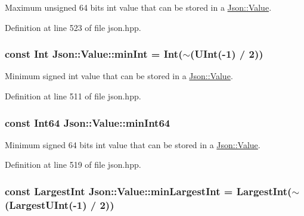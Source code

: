Maximum unsigned 64 bits int value that can be stored in a \hyperlink{class_json_1_1_value}{Json\-::\-Value}. 



Definition at line 523 of file json.\-hpp.

\hypertarget{class_json_1_1_value_a7df8a39e2502b8c92a6a41e3d752d2c8}{
\subsubsection[{min\-Int}]{\setlength{\rightskip}{0pt plus 5cm}const {\bf Int} Json\-::\-Value\-::min\-Int = {\bf Int}($\sim$({\bf U\-Int}(-\/1) / 2))\hspace{0.3cm}{\ttfamily [static]}}}\label{class_json_1_1_value_a7df8a39e2502b8c92a6a41e3d752d2c8}


Minimum signed int value that can be stored in a \hyperlink{class_json_1_1_value}{Json\-::\-Value}. 



Definition at line 511 of file json.\-hpp.

\hypertarget{class_json_1_1_value_a815ef899bc312c93bc426511acfe31a7}{
\subsubsection[{min\-Int64}]{\setlength{\rightskip}{0pt plus 5cm}const {\bf Int64} Json\-::\-Value\-::min\-Int64\hspace{0.3cm}{\ttfamily [static]}}}\label{class_json_1_1_value_a815ef899bc312c93bc426511acfe31a7}


Minimum signed 64 bits int value that can be stored in a \hyperlink{class_json_1_1_value}{Json\-::\-Value}. 



Definition at line 519 of file json.\-hpp.

\hypertarget{class_json_1_1_value_af91df130daa50dd43d2cd89e6ee67706}{
\subsubsection[{min\-Largest\-Int}]{\setlength{\rightskip}{0pt plus 5cm}const {\bf Largest\-Int} Json\-::\-Value\-::min\-Largest\-Int = {\bf Largest\-Int}($\sim$({\bf Largest\-U\-Int}(-\/1) / 2))\hspace{0.3cm}{\ttfamily [static]}}}\label{class_json_1_1_value_af91df130daa50dd43d2cd89e6ee67706}



